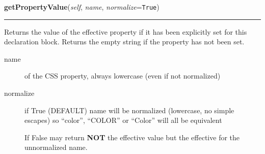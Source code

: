     \vspace{0.5ex}

\hspace{.8\funcindent}\begin{boxedminipage}{\funcwidth}

    \raggedright \textbf{getPropertyValue}(\textit{self}, \textit{name}, \textit{normalize}={\tt True})

    \vspace{-1.5ex}

    \rule{\textwidth}{0.5\fboxrule}
\setlength{\parskip}{2ex}

Returns the value of the effective property if it has been explicitly
set for this declaration block. Returns the empty string if the
property has not been set.
\begin{description}
\item[{name}] \leavevmode 
of the CSS property, always lowercase (even if not normalized)

\item[{normalize}] \leavevmode 
if True (DEFAULT) name will be normalized (lowercase, no simple
escapes) so ``color'', ``COLOR'' or ``Color'' will all be equivalent

If False may return \textbf{NOT} the effective value but the effective
for the unnormalized name.

\end{description}
\setlength{\parskip}{1ex}
    \end{boxedminipage}

    \label{cssutils:css:cssstyledeclaration:CSSStyleDeclaration:getPropertyPriority}

    \vspace{0.5ex}

